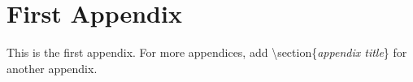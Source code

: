 \appendix
\section{First Appendix}
This is the first appendix. For more appendices, add \textbackslash section\{\textit{appendix title}\} for another appendix. 